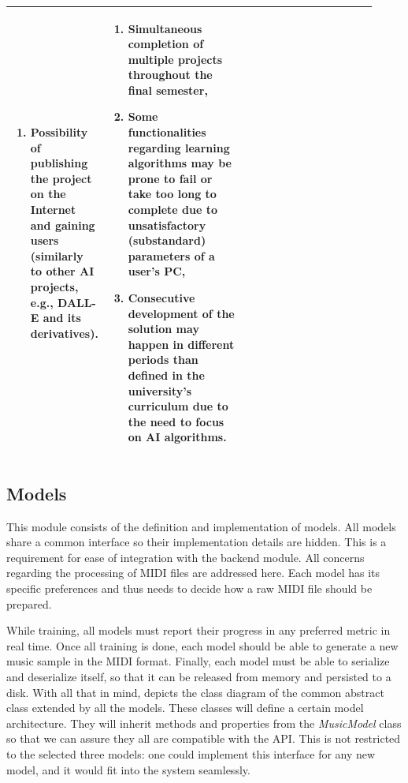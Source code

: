 \documentclass[a4paper, 11pt, twoside]{report}
\theoremstyle{definition}
\begin{document}
\begin{table}[H]
\begin{tabular}{ |P{0.14\linewidth}|P{0.39\linewidth}|P{0.39\linewidth}| }
\begin{enumerate}
                                                 \setlength{\baselineskip}{14pt}    \item Possibility of publishing the project on the Internet and gaining users (similarly to other AI projects, e.g., DALL-E and its derivatives).
                                                 \setlength{\baselineskip}{14pt}\end{enumerate} &
        \setlength{\baselineskip}{14pt}\begin{enumerate}
                                           \setlength{\baselineskip}{14pt}    \item Simultaneous completion of multiple projects throughout the final semester,
                                                 \setlength{\baselineskip}{14pt}    \item Some functionalities regarding learning algorithms may be prone to fail or take too long to complete due to unsatisfactory (substandard) parameters of a user's PC,
                                                 \setlength{\baselineskip}{14pt}    \item Consecutive development of the solution may happen in different periods than defined in the university's curriculum due to the need to focus on AI algorithms.
                                                 \setlength{\baselineskip}{14pt}\end{enumerate}                                                          \\
        \hline
    \end{tabular}
\end{table}

\subsection{Models}

This module consists of the definition and implementation of models. All models share a common interface so their implementation details are hidden. This is a requirement for ease of integration with the backend module. All concerns regarding the processing of MIDI files are addressed here. Each model has its specific preferences and thus needs to decide how a raw MIDI file should be prepared. \par
While training, all models must report their progress in any preferred metric in real time. Once all training is done, each model should be able to generate a new music sample in the MIDI format. Finally, each model must be able to serialize and deserialize itself, so that it can be released from memory and persisted to a disk. With all that in mind,  depicts the class diagram of the common abstract class extended by all the models. These classes will define a certain model architecture. They will inherit methods and properties from the \textit{MusicModel} class so that we can assure they all are compatible with the API. This is not restricted to the selected three models: one could implement this interface for any new model, and it would fit into the system seamlessly. \par
\end{document}
